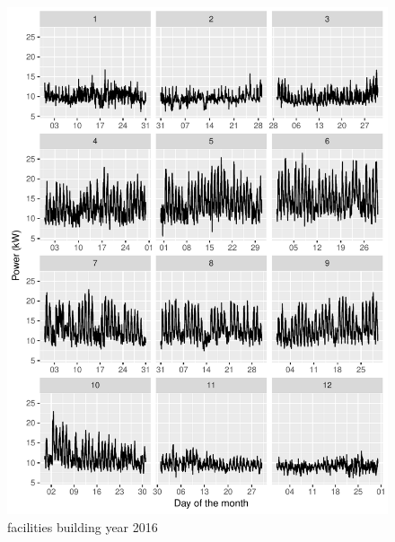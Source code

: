 \documentclass[11pt, oneside]{article}   	%
\begin{document}
\begin{figure}
\includegraphics[keepaspectratio]{facilities_build_Y2016.pdf}
\caption{facilities building year 2016 }
\end{figure}
\end{document}
